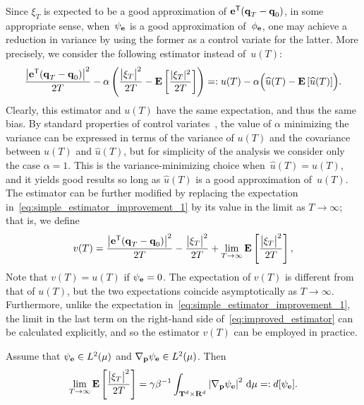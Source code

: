 \documentclass[11pt,a4paper]{article}
\begin{document}
Since $\xi_T$ is expected to be a good approximation of $\boldsymbol{\mathbf e}^\mathsf T(\boldsymbol{\mathbf q}_T - \boldsymbol{\mathbf q}_0)$,
in some appropriate sense,
when~$\psi_{\boldsymbol{\mathbf e}}$ is a good approximation of~$\phi_{\boldsymbol{\mathbf e}}$,
one may achieve a reduction in variance by using the former as a control variate for the latter.
More precisely, we consider the following estimator instead of~$u(T)$:
\begin{equation}
    \label{eq:simple_estimator_improvement_1}
     \frac{\bigl\lvert \boldsymbol{\mathbf e}^\mathsf T (\boldsymbol{\mathbf q}_T - \boldsymbol{\mathbf q}_0) \bigr\rvert^2}{2T}  -	\alpha  \left( \frac{\bigl\lvert \xi_T \bigr\rvert^2}{2T} - \mathbf{E} \left[ \frac{\lvert \xi_T \rvert^2}{2T} \right] \right)
    =: u(T) - \alpha \Bigl(\widehat u(T) - \mathbf{E} \left[\widehat u(T)\right]\Bigr).
\end{equation}
Clearly, this estimator and $u(T)$ have the same expectation, and thus the same bias.
By standard properties of control variates~\cite{kroese2013handbook},
the value of $\alpha$ minimizing the variance can be expressed in terms of the variance of $u(T)$ and
the covariance between $u(T)$ and $\widehat u(T)$,
but for simplicity of the analysis we consider only the case $\alpha = 1$.
This is the variance-minimizing choice when~$\widehat u(T) = u(T)$,
and it yields good results so long as $\widehat u(T)$ is a good approximation of~$u(T)$.
The estimator can be further modified by replacing the expectation in~\eqref{eq:simple_estimator_improvement_1} by its value in the limit as $T \to \infty$;
that is, we define
\begin{equation}
    \label{eq:improved_estimator}
    v(T) =  \frac{\bigl\lvert \boldsymbol{\mathbf e}^\mathsf T(\boldsymbol{\mathbf q}_T - \boldsymbol{\mathbf q}_0) \bigr\rvert^2}{2T} - \frac{\bigl\lvert \xi_T \bigr\rvert^2}{2T} + \lim_{T \to \infty} \mathbf{E} \left[\frac{\bigl\lvert \xi_T \bigr\rvert^2}{2T}\right],
\end{equation}
Note that $v(T) = u(T)$ if $\psi_{\boldsymbol{\mathbf e}} = 0$.
The expectation of $v(T)$ is different from that of $u(T)$,
but the two expectations coincide asymptotically as $T \to \infty$.
Furthermore, unlike the expectation in~\eqref{eq:simple_estimator_improvement_1},
the limit in the last term on the right-hand side of~\eqref{eq:improved_estimator} can be calculated explicitly,
and so the estimator $v(T)$ can be employed in practice.
\begin{lemma}
    \label{lemma:explicit_limit}
    Assume that $\psi_{\boldsymbol{\mathbf e}} \in L^2(\mu)$ and $\nabla_{\boldsymbol{\mathbf p}} \psi_{\boldsymbol{\mathbf e}} \in L^2(\mu)$.
    Then
    \begin{equation}
        \label{eq:explicit_limit}
        \lim_{T \to \infty} \expect \left[\frac{\bigl\lvert \xi_T \bigr\rvert^2}{2T}\right] = \gamma \beta^{-1} \int_{\torus^d \times \real^d} \abs{\grad_{\vect p} \psi_{\vect e}}^2 \, \d \mu =: d[\psi_{\vect e}].
    \end{equation}
\end{lemma}
\end{document}
